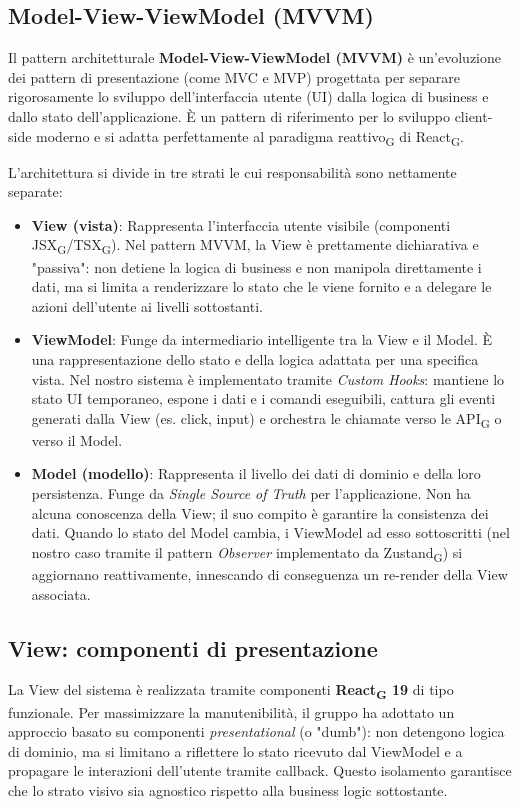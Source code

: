 \documentclass[11pt,a4paper]{article}
\newcommand{\gls}[1]{#1\textsubscript{G}}
\begin{document}
\subsection{Model-View-ViewModel (MVVM)}
Il pattern architetturale \textbf{Model-View-ViewModel (MVVM)} è un'evoluzione dei pattern di presentazione (come MVC e MVP) progettata per separare rigorosamente lo sviluppo dell'interfaccia utente (UI) dalla logica di business e dallo stato dell'applicazione. È un pattern di riferimento per lo sviluppo client-side moderno e si adatta perfettamente al \gls{paradigma reattivo} di \gls{React}.

L'architettura si divide in tre strati le cui responsabilità sono nettamente separate:

\begin{itemize}
    \item \textbf{View (vista)}: Rappresenta l'interfaccia utente visibile (componenti \gls{JSX}/\gls{TSX}). Nel pattern MVVM, la View è prettamente dichiarativa e "passiva": non detiene la logica di business e non manipola direttamente i dati, ma si limita a renderizzare lo stato che le viene fornito e a delegare le azioni dell'utente ai livelli sottostanti.
    \item \textbf{ViewModel}: Funge da intermediario intelligente tra la View e il Model. È una rappresentazione dello stato e della logica adattata per una specifica vista. Nel nostro sistema è implementato tramite \textit{Custom Hooks}: mantiene lo stato UI temporaneo, espone i dati e i comandi eseguibili, cattura gli eventi generati dalla View (es. click, input) e orchestra le chiamate verso le \gls{API} o verso il Model.
    \item \textbf{Model (modello)}: Rappresenta il livello dei dati di dominio e della loro persistenza. Funge da \textit{Single Source of Truth} per l'applicazione. Non ha alcuna conoscenza della View; il suo compito è garantire la consistenza dei dati. Quando lo stato del Model cambia, i ViewModel ad esso sottoscritti (nel nostro caso tramite il pattern \textit{Observer} implementato da \gls{Zustand}) si aggiornano reattivamente, innescando di conseguenza un re-render della View associata.
\end{itemize}


\subsection{View: componenti di presentazione}
La View del sistema è realizzata tramite componenti \textbf{\gls{React} 19} di tipo funzionale. Per massimizzare la manutenibilità, il gruppo ha adottato un approccio basato su componenti \textit{presentational} (o "dumb"): non detengono logica di dominio, ma si limitano a riflettere lo stato ricevuto dal ViewModel e a propagare le interazioni dell'utente tramite callback. Questo isolamento garantisce che lo strato visivo sia agnostico rispetto alla business logic sottostante.
\end{document}
